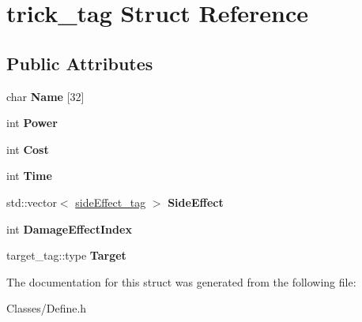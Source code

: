 \hypertarget{structtrick__tag}{}\section{trick\+\_\+tag Struct Reference}
\label{structtrick__tag}
\subsection*{Public Attributes}
\begin{DoxyCompactItemize}
\item 
char {\bfseries Name} \mbox{[}32\mbox{]}\hypertarget{structtrick__tag_a19f10c215adf43633d12dd93e5a32b6e}{}\label{structtrick__tag_a19f10c215adf43633d12dd93e5a32b6e}

\item 
int {\bfseries Power}\hypertarget{structtrick__tag_a0fba9770964892006f897cd5c51f42b3}{}\label{structtrick__tag_a0fba9770964892006f897cd5c51f42b3}

\item 
int {\bfseries Cost}\hypertarget{structtrick__tag_a32e41cc02cb205223cd9b9f5cc0ee308}{}\label{structtrick__tag_a32e41cc02cb205223cd9b9f5cc0ee308}

\item 
int {\bfseries Time}\hypertarget{structtrick__tag_a05502ec2cc3492a6fbfd95f4fe1a4a63}{}\label{structtrick__tag_a05502ec2cc3492a6fbfd95f4fe1a4a63}

\item 
std\+::vector$<$ \hyperlink{structside_effect__tag}{side\+Effect\+\_\+tag} $>$ {\bfseries Side\+Effect}\hypertarget{structtrick__tag_a51a55706c976b33a7d1dcea66c31545f}{}\label{structtrick__tag_a51a55706c976b33a7d1dcea66c31545f}

\item 
int {\bfseries Damage\+Effect\+Index}\hypertarget{structtrick__tag_a7f90a4a3789d9368464a1a3628256666}{}\label{structtrick__tag_a7f90a4a3789d9368464a1a3628256666}

\item 
target\+\_\+tag\+::type {\bfseries Target}\hypertarget{structtrick__tag_aed4f67e34e35d771fde58c1448d4c39f}{}\label{structtrick__tag_aed4f67e34e35d771fde58c1448d4c39f}

\end{DoxyCompactItemize}


The documentation for this struct was generated from the following file\+:\begin{DoxyCompactItemize}
\item 
Classes/Define.\+h\end{DoxyCompactItemize}
